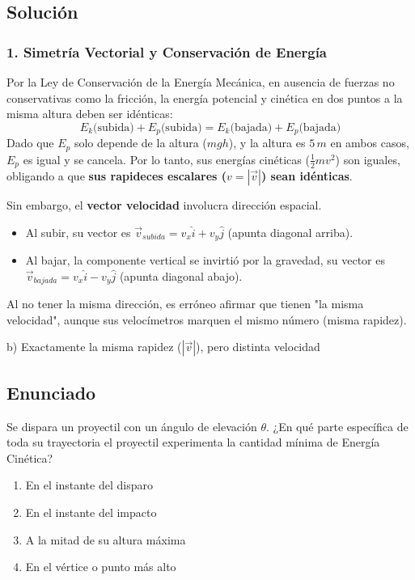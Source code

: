 \documentclass[12pt, a4paper]{article}
\begin{document}
\subsection*{Solución}

\subsubsection*{1. Simetría Vectorial y Conservación de Energía}
Por la Ley de Conservación de la Energía Mecánica, en ausencia de fuerzas no conservativas como la fricción, la energía potencial y cinética en dos puntos a la misma altura deben ser idénticas:
$$ E_k \text{(subida)} + E_p \text{(subida)} = E_k \text{(bajada)} + E_p \text{(bajada)} $$
Dado que $E_p$ solo depende de la altura ($mgh$), y la altura es $5\,\si{m}$ en ambos casos, $E_p$ es igual y se cancela. Por lo tanto, sus energías cinéticas ($\frac{1}{2}mv^2$) son iguales, obligando a que \textbf{sus rapideces escalares ($v = |\vec{v}|$) sean idénticas}.

Sin embargo, el \textbf{vector velocidad} involucra dirección espacial.
\begin{itemize}
    \item Al subir, su vector es $\vec{v}_{subida} = v_x\hat{i} + v_y\hat{j}$ (apunta diagonal arriba).
    \item Al bajar, la componente vertical se invirtió por la gravedad, su vector es $\vec{v}_{bajada} = v_x\hat{i} - v_y\hat{j}$ (apunta diagonal abajo).
\end{itemize}
Al no tener la misma dirección, es erróneo afirmar que tienen "la misma velocidad", aunque sus velocímetros marquen el mismo número (misma rapidez).

\begin{tcolorbox}[colback=green!5!white, colframe=green!50!black, title=Respuesta Final]
\centering \Large b) Exactamente la misma rapidez ($|\vec{v}|$), pero distinta velocidad
\end{tcolorbox}

\newpage

\subsection*{Enunciado}
Se dispara un proyectil con un ángulo de elevación $\theta$. ¿En qué parte específica de toda su trayectoria el proyectil experimenta la cantidad mínima de Energía Cinética?
\begin{enumerate}[label=\alph*)]
    \item En el instante del disparo
    \item En el instante del impacto
    \item A la mitad de su altura máxima
    \item En el vértice o punto más alto
\end{enumerate}
\end{document}
